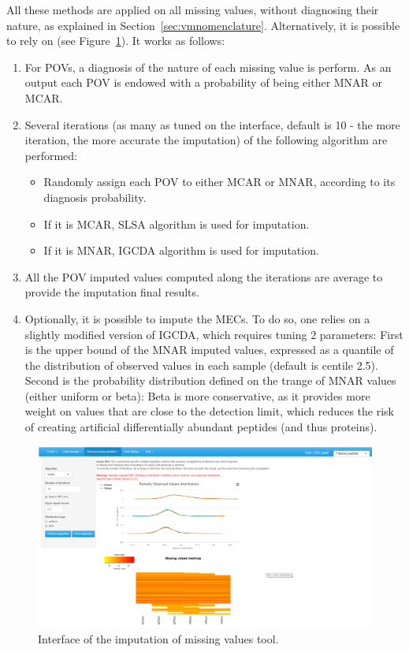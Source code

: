 \documentclass[12pt]{article}
\begin{document}
All these methods are applied on all missing values, without diagnosing their nature, as explained in Section~\ref{sec:vmnomenclature}.
Alternatively, it is possible to rely on  (see Figure~\ref{fig:peptide-imp4p}). It works as follows:
\begin{enumerate}
	\item For POVs, a diagnosis of the nature of each missing value is perform. As an output each POV is endowed with a probability of being either MNAR or MCAR.
	\item Several iterations (as many as tuned on the interface, default is 10 - the more iteration, the more accurate the imputation) of the following algorithm are performed:
		\begin{itemize}
			\item Randomly assign each POV to either MCAR or MNAR, according to its diagnosis probability.
			\item If it is MCAR, SLSA algorithm is used for imputation.
			\item If it is MNAR, IGCDA algorithm is used for imputation.
		\end{itemize}
	\item All the POV imputed values computed along the iterations are average to provide the imputation final results.
	\item Optionally, it is possible to impute the MECs. To do so, one relies on a slightly modified version of IGCDA, which requires tuning 2 parameters: First is the upper bound of the MNAR imputed values, expressed as a quantile of the distribution of observed values in each sample (default is centile 2.5). Second is the probability distribution defined on the trange of MNAR values (either uniform or beta): Beta is more conservative, as it provides more weight on values that are close to the detection limit, which reduces the risk of creating artificial differentially abundant peptides (and thus proteins).
\end{enumerate}

\begin {figure}
\includegraphics[width=\textwidth]{images/peptide-imp4p.png}
\caption{Interface of the imputation of missing values tool.}\label{fig:peptide-imp4p}
\end {figure}
\end{document}
